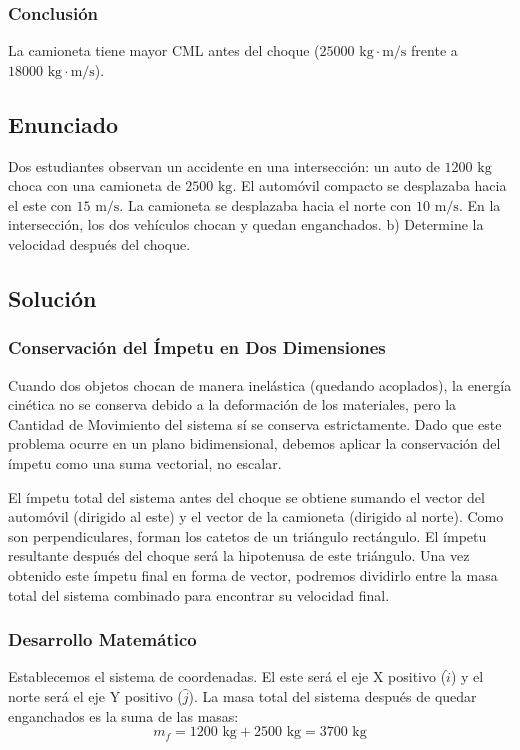 \documentclass{article}
\begin{document}
\subsubsection*{Conclusión}
La camioneta tiene mayor CML antes del choque ($25000 \text{ kg}\cdot\text{m/s}$ frente a $18000 \text{ kg}\cdot\text{m/s}$).

\newpage

\subsection*{Enunciado}
Dos estudiantes observan un accidente en una intersección: un auto de $1200 \text{ kg}$ choca con una camioneta de $2500 \text{ kg}$. El automóvil compacto se desplazaba hacia el este con $15 \text{ m/s}$. La camioneta se desplazaba hacia el norte con $10 \text{ m/s}$. En la intersección, los dos vehículos chocan y quedan enganchados.
b) Determine la velocidad después del choque.

\subsection*{Solución}

\subsubsection*{Conservación del Ímpetu en Dos Dimensiones}
Cuando dos objetos chocan de manera inelástica (quedando acoplados), la energía cinética no se conserva debido a la deformación de los materiales, pero la Cantidad de Movimiento del sistema sí se conserva estrictamente. Dado que este problema ocurre en un plano bidimensional, debemos aplicar la conservación del ímpetu como una suma vectorial, no escalar.

El ímpetu total del sistema antes del choque se obtiene sumando el vector del automóvil (dirigido al este) y el vector de la camioneta (dirigido al norte). Como son perpendiculares, forman los catetos de un triángulo rectángulo. El ímpetu resultante después del choque será la hipotenusa de este triángulo. Una vez obtenido este ímpetu final en forma de vector, podremos dividirlo entre la masa total del sistema combinado para encontrar su velocidad final.

\subsubsection*{Desarrollo Matemático}
Establecemos el sistema de coordenadas. El este será el eje X positivo ($\hat{i}$) y el norte será el eje Y positivo ($\hat{j}$).
La masa total del sistema después de quedar enganchados es la suma de las masas:
$$m_f = 1200 \text{ kg} + 2500 \text{ kg} = 3700 \text{ kg}$$
\end{document}
